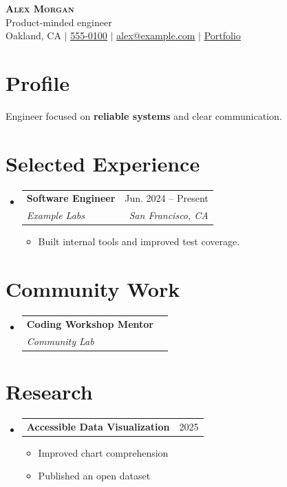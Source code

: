 \documentclass[letterpaper,11pt]{article}
\makeatletter
\newcommand{\resumeLink}[2]{\underline{\href{#1}{#2}}}
\newcommand{\resumeSection}[1]{\section{#1}}
\newcommand{\resumeSubHeadingListStart}{\begin{itemize}[leftmargin=0.15in, label={}]}
\newcommand{\resumeSubHeadingListEnd}{\end{itemize}}
\newcommand{\resumeItemListStart}{\begin{itemize}}
\newcommand{\resumeItemListEnd}{\end{itemize}\vspace{-5pt}}
\newcommand{\resumeItem}[1]{\item\small{{#1 \vspace{-2pt}}}}
\newcommand{\resumeSubheading}[4]{\vspace{-2pt}\item\begin{tabular*}{0.97\textwidth}[t]{l@{\extracolsep{\fill}}r}\textbf{#1} & #2 \\\textit{\small#3} & \textit{\small #4} \\\end{tabular*}\vspace{-7pt}}
\newcommand{\resumeProjectHeading}[2]{\item\begin{tabular*}{0.97\textwidth}{l@{\extracolsep{\fill}}r}\small#1 & #2 \\\end{tabular*}\vspace{-7pt}}
\newcommand{\resumeSingleLine}[2]{\resumeProjectHeading{\textbf{#1}}{#2}}
\newcommand{\resumeTextBlock}[1]{\small{#1\par}\vspace{-2pt}}
\makeatother
\begin{document}
\begin{center}
    \textbf{\Huge \scshape Alex Morgan} \\ \vspace{5pt}
    \small Product-minded engineer \\
    \small Oakland, CA $|$ \resumeLink{tel:555-0100}{555-0100} $|$ \resumeLink{mailto:alex@example.com}{alex@example.com} $|$ \resumeLink{https://example.com}{Portfolio} \\
\end{center}
\resumeSection{Profile}
\resumeTextBlock{Engineer focused on \textbf{reliable systems} and clear communication.}
\resumeSection{Selected Experience}
\resumeSubHeadingListStart
\resumeSubheading{Software Engineer}{Jun. 2024 -- Present}{Example Labs}{San Francisco, CA}
\resumeItemListStart
\resumeItem{Built internal tools and improved test coverage.}
\resumeItemListEnd
\resumeSubHeadingListEnd
\resumeSection{Community Work}
\resumeSubHeadingListStart
\resumeSubheading{Coding Workshop Mentor}{}{Community Lab}{}
\resumeSubHeadingListEnd
\resumeSection{Research}
\resumeSubHeadingListStart
\resumeSingleLine{Accessible Data Visualization}{2025}
\resumeItemListStart
\resumeItem{Improved chart comprehension}
\resumeItem{Published an open dataset}
\resumeItemListEnd
\resumeSubHeadingListEnd
\end{document}
